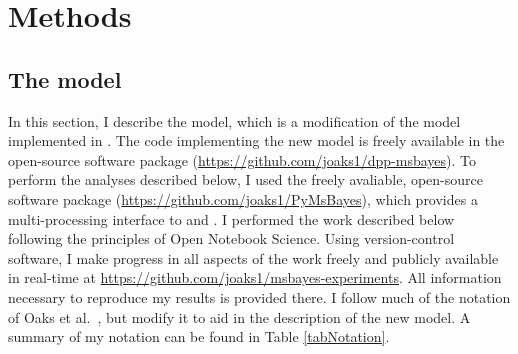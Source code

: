\section{Methods}

\subsection{The model}
In this section, I describe the model, which is a modification of the model
implemented in \msb \cite{Huang2011,Oaks2012}.
The code implementing the new model is freely available in the open-source
software package \dppmsbayes
(\href{https://github.com/joaks1/dpp-msbayes}{\url{https://github.com/joaks1/dpp-msbayes}}).
To perform the analyses described below, I used the freely avaliable,
open-source software package \pymsbayes
(\href{https://github.com/joaks1/PyMsBayes}{\url{https://github.com/joaks1/PyMsBayes}}),
which provides a multi-processing interface to \msb and
\dppmsbayes.
I performed the work described below following the principles of
Open Notebook Science.
Using version-control software, I make progress in all aspects of the work
freely and publicly available in real-time at
\href{https://github.com/joaks1/msbayes-experiments}{\url{https://github.com/joaks1/msbayes-experiments}}.
All information necessary to reproduce my results is provided there.
I follow much of the notation of Oaks et al.\ \cite{Oaks2012}, but modify it to
aid in the description of the new model.
A summary of my notation can be found in Table \ref{tabNotation}.

